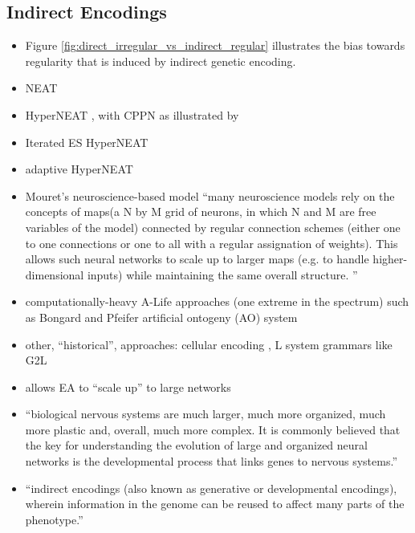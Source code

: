\subsection{Indirect Encodings} \label{sec:indirect_encodings}
  \begin{itemize}
    \item Figure \ref{fig:direct_irregular_vs_indirect_regular} illustrates the bias towards regularity that is induced by indirect genetic encoding.
  	\item NEAT \cite[p 324]{Downing2015IntelligenceSystems}
    \item HyperNEAT \cite[p 339]{Downing2015IntelligenceSystems}, with CPPN as illustrated by 
    \item Iterated ES HyperNEAT \cite{Risi2011EnhancingNetworks}
    \item adaptive HyperNEAT \cite{Risi2010IndirectlyRules}
    \item Mouret's neuroscience-based model ``many neuroscience models rely on the concepts of maps(a N by M grid of neurons, in which N and M are free variables of the model) connected by regular connection schemes (either one to one connections or one to all with a regular assignation of  weights). This allows such neural  networks to scale up to larger maps (e.g. to handle higher-dimensional inputs) while maintaining the same overall structure. '' \cite{Mouret2010ImportingGanglia} 
    \item computationally-heavy A-Life approaches (one extreme in the spectrum) such as Bongard and Pfeifer artificial ontogeny (AO) system \cite[p 345]{Downing2015IntelligenceSystems}
    \item other, ``historical'', approaches: cellular encoding \cite[p 334]{Downing2015IntelligenceSystems}, L system grammars like G2L \cite[p 335]{Downing2015IntelligenceSystems}
    \item allows EA to ``scale up'' to large networks
    \item  ``biological nervous systems are much larger, much more organized, much more plastic and, overall, much more complex. It is commonly believed that the key for understanding the evolution of  large and organized neural networks is the developmental process that links genes to nervous systems.'' \cite{Tonelli2013OnNetworks}
    \item ``indirect encodings (also known as generative or developmental encodings), wherein information in the genome can be reused to affect many parts of the phenotype.'' \cite{Clune2011OnRegularity}

\end{itemize}

